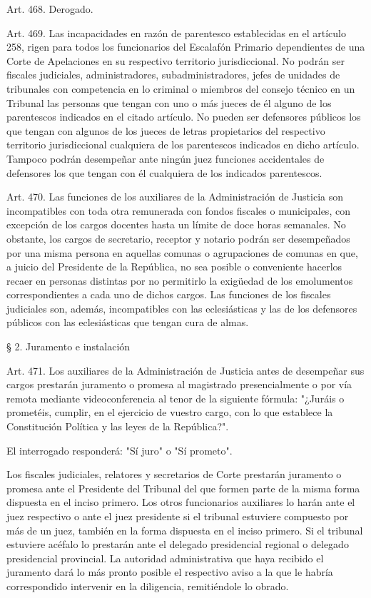     Art. 468. Derogado.

    Art. 469. Las incapacidades en razón de parentesco establecidas en el artículo 258, rigen para todos los funcionarios del Escalafón Primario dependientes de una Corte de Apelaciones en su respectivo territorio jurisdiccional.
    No podrán ser fiscales judiciales, administradores, subadministradores, jefes de unidades de tribunales con competencia en lo criminal o miembros del consejo técnico en un Tribunal las personas que tengan con uno o más jueces de él alguno de los parentescos indicados en el citado artículo.
    No pueden ser defensores públicos los que tengan con algunos de los jueces de letras propietarios del respectivo territorio jurisdiccional cualquiera de los parentescos indicados en dicho artículo.
    Tampoco podrán desempeñar ante ningún juez funciones accidentales de defensores los que tengan con él cualquiera de los indicados parentescos.




    Art. 470. Las funciones de los auxiliares de la Administración de Justicia son incompatibles con toda otra remunerada con fondos fiscales o municipales, con excepción de los cargos docentes hasta un límite de doce horas semanales.
    No obstante, los cargos de secretario, receptor y notario podrán ser desempeñados por una misma persona en aquellas comunas o agrupaciones de comunas en que, a juicio del Presidente de la República, no sea posible o conveniente hacerlos recaer en personas distintas por no permitirlo la exigüedad de los emolumentos correspondientes a cada uno de dichos cargos.
    Las funciones de los fiscales judiciales son, además, incompatibles con las eclesiásticas y las de los defensores públicos con las eclesiásticas que tengan cura de almas.



    § 2. Juramento e instalación


    Art. 471. Los auxiliares de la Administración de Justicia antes de desempeñar sus cargos prestarán juramento o promesa al magistrado presencialmente o por vía remota mediante videoconferencia al tenor de la siguiente fórmula: "¿Juráis o prometéis, cumplir, en el ejercicio de vuestro cargo, con lo que establece la Constitución Política y las leyes de la República?".
     
    El interrogado responderá: "Sí juro" o "Sí prometo".
     
    Los fiscales judiciales, relatores y secretarios de Corte prestarán juramento o promesa ante el Presidente del Tribunal del que formen parte de la misma forma dispuesta en el inciso primero.
    Los otros funcionarios auxiliares lo harán ante el juez respectivo o ante el juez presidente si el tribunal estuviere compuesto por más de un juez, también en la forma dispuesta en el inciso primero. Si el tribunal estuviere acéfalo lo prestarán ante el delegado presidencial regional o delegado presidencial provincial. La autoridad administrativa que haya recibido el juramento dará lo más pronto posible el respectivo aviso a la que le habría correspondido intervenir en la diligencia, remitiéndole lo obrado.


